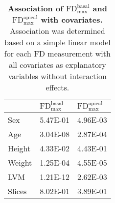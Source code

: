 \begin{table}[htbp]
  \centering
  \caption{\textbf{Association of \(\text{FD}_\text{max}^\text{basal}\) and \(\text{FD}_\text{max}^\text{apical}\) with covariates. } Association was determined based on a simple linear model for each FD measurement with all covariates as explanatory variables without interaction effects.}
    \begin{tabular}{lll}
    \toprule
          &  \(\text{FD}_\text{max}^\text{basal}\) & \(\text{FD}_\text{max}^\text{apical}\) \\
    \midrule
    Sex   & \num{5.47E-01} & \num{4.96E-03} \\
    Age   & \num{3.04E-08} & \num{2.87E-04} \\
    Height & \num{4.33E-02} & \num{4.43E-01} \\
    Weight & \num{1.25E-04} & \num{4.55E-05} \\
    LVM   & \num{1.21E-12} & \num{2.62E-03} \\
    Slices & \num{8.02E-01} & \num{3.89E-01} \\
    \bottomrule
    \end{tabular}%
  \label{tab:covariates-FD}%
\end{table}%